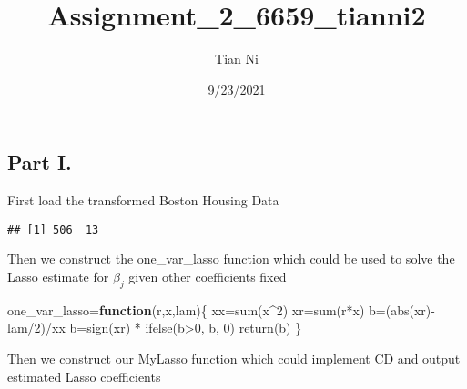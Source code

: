 \documentclass[
]{article}
\title{Assignment\_2\_6659\_tianni2}
\author{Tian Ni}
\date{9/23/2021}
\newenvironment{Shaded}{\begin{snugshade}}{\end{snugshade}}
\newcommand{\AttributeTok}[1]{\textcolor[rgb]{0.77,0.63,0.00}{#1}}
\newcommand{\ConstantTok}[1]{\textcolor[rgb]{0.00,0.00,0.00}{#1}}
\newcommand{\ControlFlowTok}[1]{\textcolor[rgb]{0.13,0.29,0.53}{\textbf{#1}}}
\newcommand{\DecValTok}[1]{\textcolor[rgb]{0.00,0.00,0.81}{#1}}
\newcommand{\FunctionTok}[1]{\textcolor[rgb]{0.00,0.00,0.00}{#1}}
\newcommand{\NormalTok}[1]{#1}
\newcommand{\OtherTok}[1]{\textcolor[rgb]{0.56,0.35,0.01}{#1}}
\newcommand{\SpecialCharTok}[1]{\textcolor[rgb]{0.00,0.00,0.00}{#1}}
\newcommand{\StringTok}[1]{\textcolor[rgb]{0.31,0.60,0.02}{#1}}
\begin{document}
\maketitle

\hypertarget{part-i.}{%
\subsection{Part I.}\label{part-i.}}

First load the transformed Boston Housing Data

\begin{Shaded}
\end{Shaded}

\begin{verbatim}
## [1] 506  13
\end{verbatim}

Then we construct the one\_var\_lasso function which could be used to
solve the Lasso estimate for \(\beta_{j}\) given other coefficients
fixed

\begin{Shaded}
\begin{Highlighting}[]
\NormalTok{one\_var\_lasso}\OtherTok{=}\ControlFlowTok{function}\NormalTok{(r,x,lam)\{}
\NormalTok{  xx}\OtherTok{=}\FunctionTok{sum}\NormalTok{(x}\SpecialCharTok{\^{}}\DecValTok{2}\NormalTok{)}
\NormalTok{  xr}\OtherTok{=}\FunctionTok{sum}\NormalTok{(r}\SpecialCharTok{*}\NormalTok{x)}
\NormalTok{  b}\OtherTok{=}\NormalTok{(}\FunctionTok{abs}\NormalTok{(xr)}\SpecialCharTok{{-}}\NormalTok{lam}\SpecialCharTok{/}\DecValTok{2}\NormalTok{)}\SpecialCharTok{/}\NormalTok{xx}
\NormalTok{  b}\OtherTok{=}\FunctionTok{sign}\NormalTok{(xr) }\SpecialCharTok{*} \FunctionTok{ifelse}\NormalTok{(b}\SpecialCharTok{\textgreater{}}\DecValTok{0}\NormalTok{, b, }\DecValTok{0}\NormalTok{)}
  \FunctionTok{return}\NormalTok{(b)}
\NormalTok{\}}
\end{Highlighting}
\end{Shaded}

Then we construct our MyLasso function which could implement CD and
output estimated Lasso coefficients
\end{document}
